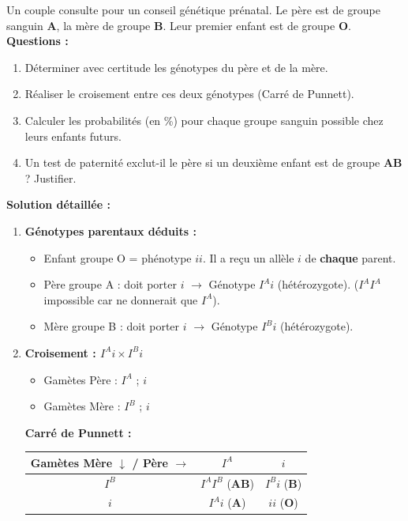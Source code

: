 \documentclass[11pt]{article}
\begin{document}
\begin{exoresolu}
Un couple consulte pour un conseil génétique prénatal. Le père est de groupe sanguin \textbf{A}, la mère de groupe \textbf{B}. Leur premier enfant est de groupe \textbf{O}.
\textbf{Questions :}
\begin{enumerate}
    \item Déterminer avec certitude les génotypes du père et de la mère.
    \item Réaliser le croisement entre ces deux génotypes (Carré de Punnett).
    \item Calculer les probabilités (en \%) pour chaque groupe sanguin possible chez leurs enfants futurs.
    \item Un test de paternité exclut-il le père si un deuxième enfant est de groupe \textbf{AB} ? Justifier.
\end{enumerate}
\tcblower
\textbf{Solution détaillée :}
\begin{enumerate}
    \item \textbf{Génotypes parentaux déduits :}
    \begin{itemize}
        \item Enfant groupe O = phénotype $ii$. Il a reçu un allèle $i$ de \textbf{chaque} parent.
        \item Père groupe A : doit porter $i$ $\rightarrow$ Génotype \textbf{$I^A i$} (hétérozygote). ($I^A I^A$ impossible car ne donnerait que $I^A$).
        \item Mère groupe B : doit porter $i$ $\rightarrow$ Génotype \textbf{$I^B i$} (hétérozygote).
    \end{itemize}
    \item \textbf{Croisement : $I^A i \times I^B i$}
    \begin{itemize}
        \item Gamètes Père : $I^A$ ; $i$
        \item Gamètes Mère : $I^B$ ; $i$
    \end{itemize}
    \textbf{Carré de Punnett :}
    \begin{center}
        \begin{tabular}{|c|c|c|}
            \hline
            \textbf{Gamètes Mère $\downarrow$ / Père $\rightarrow$} & \textbf{$I^A$} & \textbf{$i$} \\ \hline
            \textbf{$I^B$} & $I^A I^B$ (\textbf{AB}) & $I^B i$ (\textbf{B}) \\ \hline
            \textbf{$i$} & $I^A i$ (\textbf{A}) & $ii$ (\textbf{O}) \\ \hline

\end{tabular}
\end{center}
\end{enumerate}
\end{exoresolu}
\end{document}
